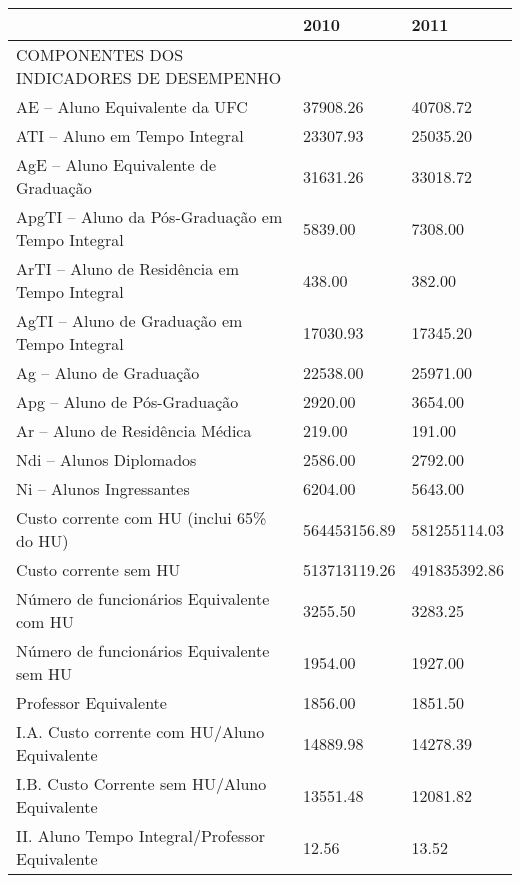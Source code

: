 \documentclass{article}
\begin{document}
\begin{tabular}{lll}
\toprule
{} &          2010 &          2011 \\
\midrule
COMPONENTES DOS INDICADORES DE DESEMPENHO                   &               &               \\
AE – Aluno Equivalente da UFC                              &  37908.26 &  40708.72 \\
ATI – Aluno em Tempo Integral                               &  23307.93 &  25035.20 \\
AgE – Aluno Equivalente de Graduação                        &  31631.26 &  33018.72 \\
ApgTI – Aluno da Pós-Graduação em Tempo Integral            &  5839.00 &  7308.00 \\
ArTI – Aluno de Residência em Tempo Integral                &  438.00 &  382.00 \\
AgTI – Aluno de Graduação em Tempo Integral                 &  17030.93 &  17345.20 \\
Ag – Aluno de Graduação                                     &  22538.00 &  25971.00 \\
Apg – Aluno de Pós-Graduação                                &  2920.00 &  3654.00 \\
Ar – Aluno de Residência Médica                             &  219.00 &  191.00 \\
Ndi – Alunos Diplomados                                     &  2586.00 &  2792.00 \\
Ni – Alunos Ingressantes                                    &  6204.00 &  5643.00 \\
Custo corrente com HU (inclui 65\% do HU)                   &  564453156.89 &  581255114.03 \\
Custo corrente sem HU                                       &  513713119.26 &  491835392.86 \\
Número de funcionários Equivalente com HU                   &  3255.50 &  3283.25 \\
Número de funcionários Equivalente sem HU                   &  1954.00 &  1927.00 \\
Professor Equivalente                                       &  1856.00 &  1851.50 \\
I.A. Custo corrente com HU/Aluno Equivalente                &  14889.98 &  14278.39 \\
I.B. Custo Corrente sem HU/Aluno Equivalente                &  13551.48 &  12081.82 \\
II. Aluno Tempo Integral/Professor Equivalente              &  12.56 &  13.52 \\

\end{tabular}
\end{document}
